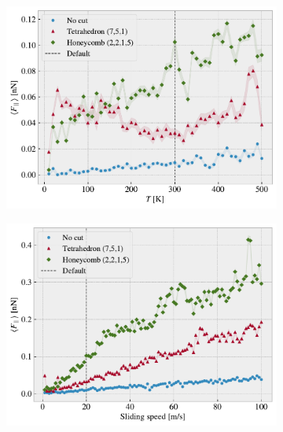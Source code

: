 \begin{figure}[H]
  \centering
  \begin{subfigure}[t]{0.49\textwidth}
      \centering
      \includegraphics[width=\textwidth]{figures/baseline/variables_temp_mean_fixmove_v20.pdf}
      \caption{}
      \label{fig:var_temp}
    \end{subfigure}
    \hfill
    \begin{subfigure}[t]{0.49\textwidth}
      \centering
      \includegraphics[width=\textwidth]{figures/baseline/variables_vel_mean_fixmove.pdf}
      \caption{}
      \label{fig:var_vel}
    \end{subfigure}
    \hfill
    \begin{subfigure}[t]{0.49\textwidth}

\end{subfigure}
\end{figure}
